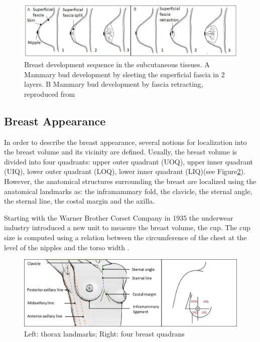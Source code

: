\begin{figure}[!h]
\centering
\includegraphics[width=0.9\linewidth,keepaspectratio]{figures/breastEvol_fascia_my.jpg} 
\caption[Breast development sequence into subcutaneous tissues. A Mammary bud development by splitting the superficial fascia in 2 layers. B Mammary bud development by superficial fascia retracting]{Breast development sequence in the subcutaneous tissues. A Mammary bud development by sleeting the superficial fascia in 2 layers. B Mammary bud development by fascia retracting, reproduced from  \citep{kopans2007breast}  }
\label{breastevol_fascia}
\end{figure}


\subsection{Breast Appearance}\label{subsection:breastappearance}

In order to describe the breast appearance, several notions for localization into the breast volume and its vicinity are defined. Usually, the breast volume is divided into four quadrants: upper outer quadrant (UOQ), upper inner quadrant (UIQ), lower outer quadrant (LOQ), lower inner quadrant (LIQ)(see Figure\ref{fig:Breast_quadrants_full}). However, the anatomical structures surrounding the breast are localized using the anatomical landmarks as:  the inframammary fold, the clavicle, the sternal angle, the sternal line, the costal margin and the axilla.

Starting with the Warner Brother Corset Company in 1935 the underwear industry introduced a new unit to measure the breast volume, the cup. The cup size is computed using a relation between the circumference of the chest at the level of the nipples and the torso width \citep{pechter_new_1998}.

\begin{figure}[h]
\centering
 \includegraphics[width=\textwidth,keepaspectratio]{figures/Breast_quadrants_full.png}
  \caption{Left: thorax landmarks; Right: four breast quadrans}\label{fig:Breast_quadrants_full}
\end{figure}



